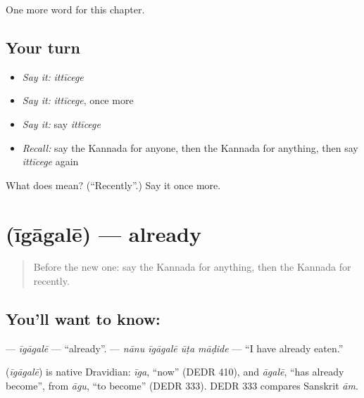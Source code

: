 \begin{grammarlens}[title={What you've built}]
One more word for this chapter.
\end{grammarlens}

\subsection*{Your turn}
\begin{itemize}
\raggedright
  \item \emph{Say it:} \emph{ittīcege}
  \item \emph{Say it:} \emph{ittīcege}, once more
  \item \emph{Say it:} say \emph{ittīcege}
  \item \emph{Recall:} say the Kannada for anyone, then the Kannada for anything, then say \emph{ittīcege} again
\end{itemize}

\begin{tcolorbox}[breakable,colback=teal!4,colframe=teal!35!black,title={Before you move on}]
What does  mean? (\textquotedblleft{}Recently\textquotedblright{}.) Say it once more.
\end{tcolorbox}
\section[\texorpdfstring{\kn{ಈಗಾಗಲೇ} (īgāgalē)}{ಈಗಾಗಲೇ (īgāgalē)}]{ (īgāgalē) — already}

\label{lesson:KA-C155-igagale}



\begin{quote}
Before the new one: say the Kannada for anything, then the Kannada for recently.
\end{quote}

\subsection*{You'll want to know: }
\textbf{} — \emph{īgāgalē} — \textquotedblleft{}already\textquotedblright{}. \textbf{   } — \emph{nānu īgāgalē ūṭa māḍide} — \textquotedblleft{}I have already eaten.\textquotedblright{}

\begin{cousinweb}
\textbf{} (\emph{īgāgalē}) is native Dravidian: \emph{īga}, \textquotedblleft{}now\textquotedblright{} (DEDR 410), and \emph{āgalē}, \textquotedblleft{}has already become\textquotedblright{}, from \emph{āgu}, \textquotedblleft{}to become\textquotedblright{} (DEDR 333). DEDR 333 compares Sanskrit \emph{ām}.
\end{cousinweb}

